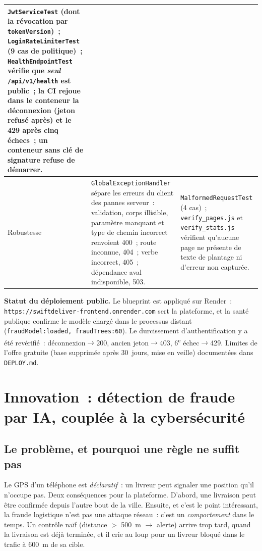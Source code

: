 \documentclass[11pt,a4paper]{article}
\begin{document}
\begin{tabular}{|p{2.7cm}|p{7.2cm}|p{4.8cm}|}
\texttt{JwtServiceTest} (dont la r\'evocation par \texttt{tokenVersion})~; \texttt{LoginRateLimiterTest} (9 cas de politique)~; \texttt{HealthEndpointTest} v\'erifie que \emph{seul} \texttt{/api/v1/health} est public~; la CI rejoue dans le conteneur la d\'econnexion (jeton refus\'e apr\`es) et le 429 apr\`es cinq \'echecs~; un conteneur sans cl\'e de signature refuse de d\'emarrer. \\
\hline
Robustesse &
\texttt{GlobalExceptionHandler} s\'epare les erreurs du client des pannes serveur~: validation, corps illisible, param\`etre manquant et type de chemin incorrect renvoient 400~; route inconnue, 404~; verbe incorrect, 405~; d\'ependance aval indisponible, 503. &
\texttt{MalformedRequestTest} (4 cas)~; \texttt{verify\_pages.js} et \texttt{verify\_stats.js} v\'erifient qu'aucune page ne pr\'esente de texte de plantage ni d'erreur non captur\'ee. \\
\hline
\end{tabular}

\medskip
\noindent
\textbf{Statut du d\'eploiement public.} Le blueprint est appliqu\'e sur Render~: \texttt{https://swiftdeliver-frontend.onrender.com} sert la plateforme, et la sant\'e publique confirme le mod\`ele charg\'e dans le processus distant (\texttt{fraudModel:loaded, fraudTrees:60}). Le durcissement d'authentification y a \'et\'e rev\'erifi\'e~: d\'econnexion$\rightarrow$200, ancien jeton$\rightarrow$403, 6\textsuperscript{e} \'echec$\rightarrow$429. Limites de l'offre gratuite (base supprim\'ee apr\`es 30~jours, mise en veille) document\'ees dans \texttt{DEPLOY.md}.

\section{Innovation~: d\'etection de fraude par IA, coupl\'ee \`a la cybers\'ecurit\'e}

\subsection{Le probl\`eme, et pourquoi une r\`egle ne suffit pas}
Le GPS d'un t\'el\'ephone est \emph{d\'eclaratif}~: un livreur peut signaler une position qu'il n'occupe pas. Deux cons\'equences pour la plateforme. D'abord, une livraison peut \^etre \og{}confirm\'ee\fg{} depuis l'autre bout de la ville. Ensuite, et c'est le point int\'eressant, la fraude logistique n'est pas une attaque r\'eseau~: c'est un \emph{comportement} dans le temps. Un contr\^ole na\"if (distance $>$ 500~m $\rightarrow$ alerte) arrive trop tard, quand la livraison est d\'ej\`a termin\'ee, et il crie au loup pour un livreur bloqu\'e dans le trafic \`a 600~m de sa cible.
\end{document}
